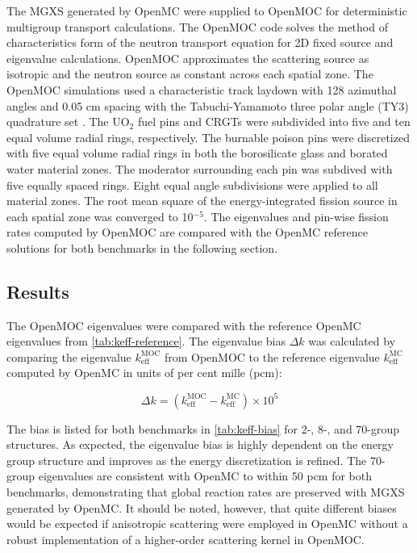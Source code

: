 The MGXS generated by OpenMC were supplied to OpenMOC \cite{boyd2014openmoc} for deterministic multigroup transport calculations. The OpenMOC code solves the method of characteristics form of the neutron transport equation for 2D fixed source and eigenvalue calculations. OpenMOC approximates the scattering source as isotropic and the neutron source as constant across each spatial zone. The OpenMOC simulations used a characteristic track laydown with 128 azimuthal angles and 0.05 cm spacing with the Tabuchi-Yamamoto three polar angle (TY3) quadrature set \cite{yamamoto2007}. The UO$_2$ fuel pins and CRGTs were subdivided into five and ten equal volume radial rings, respectively. The burnable poison pins were discretized with five equal volume radial rings in both the borosilicate glass and borated water material zones. The moderator surrounding each pin was subdived with five equally spaced rings. Eight equal angle subdivisions were applied to all material zones. The root mean square of the energy-integrated fission source in each spatial zone was converged to 10$^{-5}$. The eigenvalues and pin-wise fission rates computed by OpenMOC are compared with the OpenMC reference solutions for both benchmarks in the following section.


\subsection{Results}
\label{subsec:results}

The OpenMOC eigenvalues were compared with the reference OpenMC eigenvalues from \cref{tab:keff-reference}. The eigenvalue bias $\Delta k$ was calculated by comparing the eigenvalue $k_{\textrm{eff}}^{\textrm{MOC}}$ from OpenMOC to the reference eigenvalue $k_{\textrm{eff}}^{\textrm{MC}}$ computed by OpenMC in units of per cent mille (pcm):

\begin{equation}
\label{eqn:delta-rho}
\Delta k = \left(k_{\textrm{eff}}^{\textrm{MOC}} - k_{\textrm{eff}}^{\textrm{MC}}\right) \times 10^{5}
\end{equation}

The bias is listed for both benchmarks in \cref{tab:keff-bias} for 2-, 8-, and 70-group structures. As expected, the eigenvalue bias is highly dependent on the energy group structure and improves as the energy discretization is refined. The 70-group eigenvalues are consistent with OpenMC to within 50 pcm for both benchmarks, demonstrating that global reaction rates are preserved with MGXS generated by OpenMC. It should be noted, however, that quite different biases would be expected if anisotropic scattering were employed in OpenMC without a robust implementation of a higher-order scattering kernel in OpenMOC.

